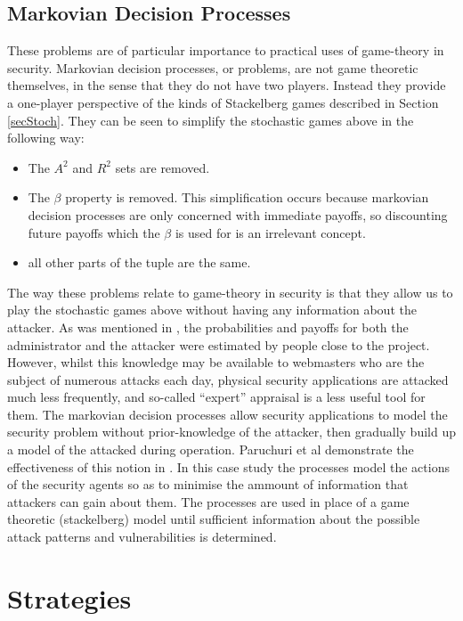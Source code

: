 \documentclass{article}
\begin{document}
\subsection{Markovian Decision Processes}

These problems are of particular importance to practical uses of game-theory in security.
Markovian decision processes, or problems, are not game theoretic themselves, in the sense that they do not have two players.
Instead they provide a one-player perspective of the kinds of Stackelberg games described in Section \ref{secStoch}.
They can be seen to simplify the stochastic games above in the following way:
\begin{itemize}
	\item The $A^2$ and $R^2$ sets are removed.
	\item The $\beta$ property is removed.
		This simplification occurs because markovian decision processes are only concerned with immediate payoffs, so discounting future payoffs which the $\beta$ is used for is an irrelevant concept.
	\item all other parts of the tuple are the same.
\end{itemize}

The way these problems relate to game-theory in security is that they allow us to play the stochastic games above without having any information about the attacker.
As was mentioned in \cite{network}, the probabilities and payoffs for both the administrator and the attacker were estimated by people close to the project.
However, whilst this knowledge may be available to webmasters who are the subject of numerous attacks each day, physical security applications are attacked much less frequently, and so-called ``expert'' appraisal is a less useful tool for them.
The markovian decision processes allow security applications to model the security problem without prior-knowledge of the attacker, then gradually build up a model of the attacked during operation.
Paruchuri et al demonstrate the effectiveness of this notion in \cite{random}.
In this case study the processes model the actions of the security agents so as to minimise the ammount of information that attackers can gain about them.
The processes are used in place of a game theoretic (stackelberg) model until sufficient information about the possible attack patterns and vulnerabilities is determined.

\newpage

\section{Strategies}
\end{document}
